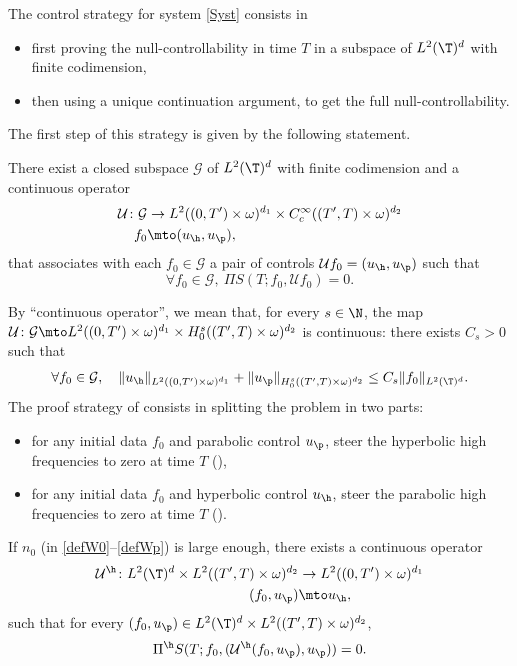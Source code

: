The control strategy for system \eqref{Syst} consists in
\begin{itemize}
\item first proving the null-controllability in time $T$ in a subspace of $L^2(\T)^d$ with finite codimension,
\item then using a unique continuation argument, to get the full null-controllability.
\end{itemize}
The first step of this strategy is given by the following statement.
\begin{prop}
\label{PropControlHighFreq}
There exist a closed subspace $\mathcal{G}$ of $L^2(\T)^{d}$ with finite codimension and a continuous operator
\begin{align*}
\mathcal U \colon
\mathcal{G} &\to L^2((0,T')\times\omega)^{d_1} \times C^\infty_c((T',T)\times\omega)^{d_2}\\
f_0 &\mto (u_{\h},u_{\p}),
\end{align*}
that associates with each $f_0 \in \mathcal{G} $ a pair of controls $\mathcal U f_{0}=(u_{\h}, u_{\p})$ such that
\begin{equation}
\label{PropK}
\forall f_0 \in \mathcal{G},\ \Pi S(T;f_0, \mathcal Uf_0) = 0.
\end{equation}
\end{prop}
By “continuous operator”, we mean that, for every $s\in\N$, the map $\mathcal{U}\colon \mathcal{G} \mto L^2((0,T')\times\omega)^{d_1}\times H_0^s((T',T)\times \omega)^{d_2}$ is continuous: there exists $C_s>0$ such that
\[
\forall f_0 \in \mathcal{G}, \quad
\|u_{\h}\|_{L^2((0,T')\times\omega)^{d_1}} + \|u_{\p}\|_{H_0^s((T',T)\times\omega)^{d_2}} \leq C_s \|f_0\|_{L^2(\T)^d}.
\]
The proof strategy of  consists in splitting the problem in two parts:
\begin{itemize}
\item for any initial data $f_0$ and parabolic control $u_{\p}$, steer the hyperbolic high frequencies to zero at time $T$ (),
\item for any initial data $f_0$ and hyperbolic control $u_{\h}$, steer the parabolic high frequencies to zero at time $T$ ().
\end{itemize}

\begin{prop}
\label{LemHyp}
If $n_0$ (in \eqref{defW0}--\eqref{defWp}) is large enough, there exists a continuous operator
\begin{align*}
\mathcal U^\h \colon L^2(\T)^{d} \times L^2((T',T)\times\omega)^{d_2} & \to L^2((0,T')\times\omega)^{d_1}\\
(f_0,u_{\p}) &\mto u_{\h},
\end{align*}
such that for every $(f_0,u_{\p})\in L^2(\T)^{d} \times L^2((T',T)\times\omega)^{d_2} $,
\begin{equation*}
\Pi^{\h} S(T;f_0, (\mathcal U^\h (f_0,u_{\p}),u_{\p})) = 0.
\end{equation*}
\end{prop}

